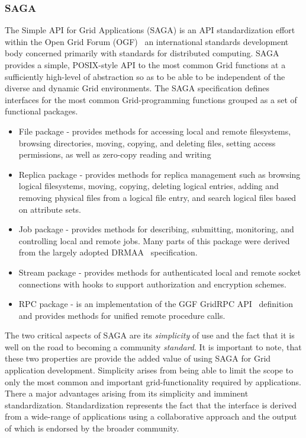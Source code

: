 \documentclass[conference,final]{IEEEtran}
\begin{document}
\subsubsection{SAGA}

The Simple API for Grid Applications (SAGA) is an API standardization
effort within the Open Grid Forum (OGF)~\cite{ogf_web} an
international standards development body concerned primarily with
standards for distributed computing.  SAGA provides a simple,
POSIX-style API to the most common Grid functions at a sufficiently
high-level of abstraction so as to be able to be independent of the
diverse and dynamic Grid environments. The SAGA specification defines
interfaces for the most common Grid-programming functions grouped as a
set of functional packages.

\begin{itemize}
\item File package - provides methods for accessing local and remote
  filesystems, browsing directories, moving, copying, and deleting
  files, setting access permissions, as well as zero-copy reading and
  writing
\item Replica package - provides methods for replica management such
  as browsing logical filesystems, moving, copying, deleting logical
  entries, adding and removing physical files from a logical file
  entry, and search logical files based on attribute sets.
\item Job package - provides methods for describing, submitting,
  monitoring, and controlling local and remote jobs. Many parts of
  this package were derived from the largely adopted
  DRMAA~\cite{drmaa_url} specification.
\item Stream package - provides methods for authenticated local and
  remote socket connections with hooks to support authorization and
  encryption schemes.
\item RPC package - is an implementation of the GGF GridRPC
  API~\cite{gridrpc_url} definition and provides methods for unified
  remote procedure calls.
\end{itemize}

The two critical aspects of SAGA are its {\it simplicity} of use and
the fact that it is well on the road to becoming a community {\it
  standard}.  It is important to note, that these two properties are
provide the added value of using SAGA for Grid application
development.  Simplicity arises from being able to limit the scope to
only the most common and important grid-functionality required by
applications.  There a major advantages arising from its simplicity
and imminent standardization.  Standardization represents the fact
that the interface is derived from a wide-range of applications using
a collaborative approach and the output of which is endorsed by the
broader community.
\end{document}
